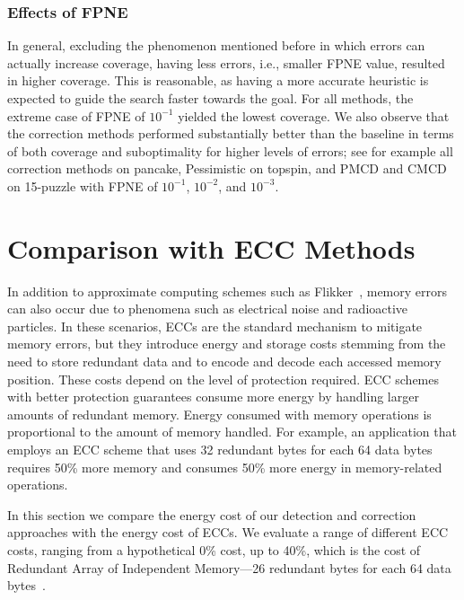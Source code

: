 \documentclass[letterpaper]{article}
\begin{document}
\subsubsection{Effects of FPNE}
In general, excluding the phenomenon mentioned before in which errors can actually increase coverage, having less errors, i.e., smaller FPNE value, resulted in higher coverage. This is reasonable, as having a more accurate heuristic is expected to guide the search faster towards the goal. For all methods, the extreme case of FPNE of $10^{-1}$ yielded the lowest coverage. We also observe that the correction methods performed substantially better than the baseline in terms of both coverage and suboptimality for higher levels of errors; see for example all correction methods on pancake, Pessimistic on topspin, and PMCD and CMCD on 15-puzzle with FPNE of $10^{-1}$, $10^{-2}$, and $10^{-3}$.

\section{Comparison with ECC Methods}

In addition to approximate computing schemes such as Flikker~\cite{Liu:2011:FSD:1950365.1950391}, memory errors can also occur due to phenomena such as electrical noise and radioactive particles. %
In these scenarios, ECCs are the standard mechanism to mitigate memory errors, but they introduce energy and storage costs stemming from the need to store redundant data and to encode and decode each accessed memory position. These costs depend on the level of protection required. ECC schemes with better protection guarantees consume more energy by handling larger amounts of redundant memory. Energy consumed with memory operations is proportional to the amount of memory handled. For example, an application that employs an ECC scheme that uses 32 redundant bytes for each 64 data bytes requires 50\% more memory and consumes 50\% more energy in memory-related operations.



In this section we compare the energy cost of our detection and correction approaches with the energy cost of ECCs.
We evaluate a range of different ECC costs, ranging from a hypothetical 0\% cost, up to 40\%, which is the cost of Redundant Array of Independent Memory---26 redundant bytes for each 64 data bytes~\cite{6136239}. %
\end{document}
